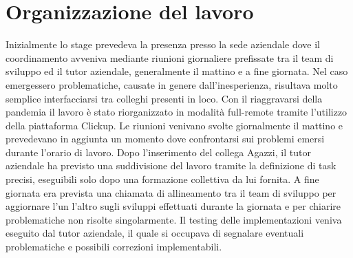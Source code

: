 \section{Organizzazione del lavoro}
Inizialmente lo stage prevedeva la presenza presso la sede aziendale dove il coordinamento avveniva mediante riunioni giornaliere prefissate tra il team di sviluppo ed il tutor aziendale, generalmente il mattino e a fine giornata. Nel caso emergessero problematiche, causate in genere dall'inesperienza, risultava molto semplice interfacciarsi tra colleghi presenti in loco. Con il riaggravarsi della pandemia il lavoro è stato riorganizzato in modalità full-remote tramite l'utilizzo della piattaforma Clickup. Le riunioni venivano svolte giornalmente il mattino e prevedevano in aggiunta un momento dove confrontarsi sui problemi emersi durante l'orario di lavoro. Dopo l'inserimento del collega Agazzi, il tutor aziendale ha previsto una suddivisione del lavoro tramite la definizione di task precisi, eseguibili solo dopo una formazione collettiva da lui fornita. A fine giornata era prevista una chiamata di allineamento tra il team di sviluppo per aggiornare l'un l'altro sugli sviluppi effettuati durante la giornata e per chiarire problematiche non risolte singolarmente. Il testing delle implementazioni veniva eseguito dal tutor aziendale, il quale si occupava di segnalare eventuali problematiche e possibili correzioni implementabili.
